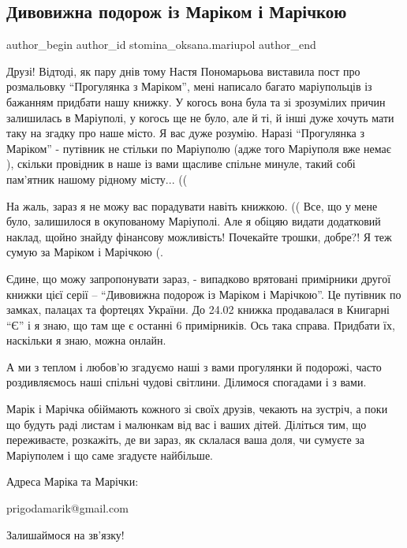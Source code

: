  
 
 
 
 

\subsection{Дивовижна подорож із Маріком і Марічкою}
\label{sec:24_01_2023.fb.stomina_oksana.mariupol.1.divovizhna_podorozh_}

\ifcmt
 author_begin
   author_id stomina_oksana.mariupol
 author_end
\fi

Друзі! Відтоді, як пару днів тому Настя Пономарьова виставила пост про
розмальовку \enquote{Прогулянка з Маріком}, мені написало багато маріупольців із
бажанням придбати нашу книжку. У когось вона була та зі зрозумілих причин
залишилась в Маріуполі, у когось ще не було, але й ті, й інші дуже хочуть мати
таку на згадку про наше місто. Я вас дуже розумію. Наразі \enquote{Прогулянка з
Маріком} - путівник не стільки по Маріуполю (адже того Маріуполя вже немає 🙁
), скільки провідник в наше із вами щасливе спільне минуле, такий собі
пам'ятник нашому рідному місту... ((

На жаль, зараз я не можу вас порадувати навіть
книжкою. (( Все, що у мене було, залишилося в
окупованому Маріуполі.  Але я обіцяю видати додатковий
наклад, щойно знайду фінансову можливість! Почекайте
трошки, добре?!  Я теж сумую за Маріком і Марічкою (. 

Єдине, що можу запропонувати зараз, - випадково
врятовані  примірники  другої книжки цієї серії –
\enquote{Дивовижна подорож із Маріком і Марічкою}. Це
путівник по замках, палацах та фортецях України.  До
24.02 книжка продавалася в Книгарні \enquote{Є} і я знаю, що
там ще є останні 6 примірників.  Ось така справа.
Придбати їх, наскільки я знаю, можна онлайн. 

А ми з теплом і любов'ю згадуємо наші з вами
прогулянки й подорожі, часто роздивляємось наші
спільні чудові світлини. Ділимося спогадами і з
вами.

Марік і Марічка обіймають кожного зі своїх друзів,
чекають на зустріч, а поки що будуть раді листам і
малюнкам від вас і ваших дітей. Діліться тим, що
переживаєте, розкажіть, де ви зараз, як склалася
ваша доля, чи сумуєте за Маріуполем і що саме
згадуєте найбільше. 

Адреса Маріка та Марічки:  

prigodamarik@gmail.com

Залишаймося на зв'язку!

